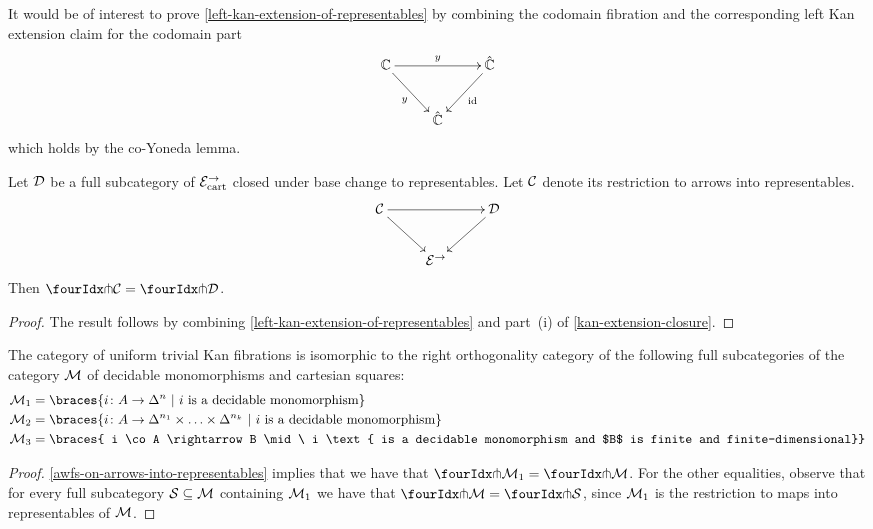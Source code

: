 \documentclass[reqno,10pt,a4paper,oneside]{amsart}
\begin{document}
\begin{remark} It would be of interest to prove \cref{left-kan-extension-of-representables} by combining 
the codomain fibration and the corresponding left Kan extension claim for the codomain part
\[
\xymatrix{
  \cat{C}
  \ar[rr]^{y}
  \ar[dr]_{y}
&&
  \hat{\catC}
  \ar[dl]^{\id}
\\&
  \hat{\cat{C}}
}
\]
which holds by the co-Yoneda lemma.
\end{remark}



\begin{lemma}
\label{awfs-on-arrows-into-representables}
Let $\cal{D}$ be a full subcategory of $\catE_{\cart}^{\to}$ closed under base change to representables.
Let $\cal{C}$ denote its restriction to arrows into representables.
\[
\xymatrix{
  \cal{C}
  \ar[rr]
  \ar[dr]
&&
  \cal{D}
  \ar[dl]
\\&
  \catE^{\to}
}
\]
Then $\liftr{\cal{C}} = \liftr{\cal{D}}$.
\end{lemma}

\begin{proof} The result follows by combining \cref{left-kan-extension-of-representables} and part~(i) of \cref{kan-extension-closure}. 
\end{proof}


\begin{theorem} \label{small-gen-triv-kan}
The category of uniform trivial Kan fibrations is isomorphic to the right orthogonality 
category of the following full subcategories of  the category $\cal{M}$ of decidable
monomorphisms and cartesian squares:
\begin{align*}
\cal{M}_1 & = \braces{i \co A \rightarrow \Delta^{n} \ | \ i \text{ is a  decidable monomorphism} } \\ 
\cal{M}_2  & = \braces{i \co A \rightarrow \Delta^{n_1} \times \ldots \times \Delta^{n_k} 
\ | \ i \text{ is a  decidable monomorphism} }  \\
\cal{M}_3  & = \braces{ i \co A \rightarrow B \mid \ i \text{ is a decidable monomorphism and 
$B$ is finite and finite-dimensional}} 
\end{align*}
\end{theorem}

\begin{proof}    \cref{awfs-on-arrows-into-representables} implies that we have that $\liftr{\cal{M}_1}  = \liftr{\cal{M}}$.
For the other equalities, observe that for every full subcategory $\cal{S} \subseteq \cal{M}$ containing $\cal{M}_1$ we have that $\liftr{\cal{M}} = \liftr{\cal{S}}$, since $\cal{M}_1$ is the restriction to maps into representables  of $\cal{M}$. 
\end{proof}
\end{document}
